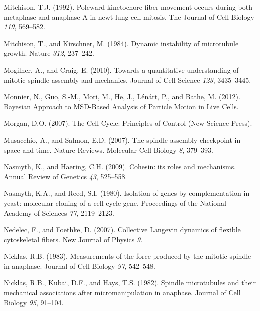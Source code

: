 \documentclass[12pt,a4paper,twoside,openright]{book}
\begin{document}
Mitchison, T.J. (1992). Poleward kinetochore fiber movement occurs
during both metaphase and anaphase-A in newt lung cell mitosis. The
Journal of Cell Biology \emph{119}, 569--582.

Mitchison, T., and Kirschner, M. (1984). Dynamic instability of
microtubule growth. Nature \emph{312}, 237--242.

Mogilner, A., and Craig, E. (2010). Towards a quantitative understanding
of mitotic spindle assembly and mechanics. Journal of Cell Science
\emph{123}, 3435--3445.

Monnier, N., Guo, S.-M., Mori, M., He, J., Lénárt, P., and Bathe, M.
(2012). Bayesian Approach to MSD-Based Analysis of Particle Motion in
Live Cells.

Morgan, D.O. (2007). The Cell Cycle: Principles of Control (New Science
Press).

Musacchio, A., and Salmon, E.D. (2007). The spindle-assembly checkpoint
in space and time. Nature Reviews. Molecular Cell Biology \emph{8},
379--393.

Nasmyth, K., and Haering, C.H. (2009). Cohesin: its roles and
mechanisms. Annual Review of Genetics \emph{43}, 525--558.

Nasmyth, K.A., and Reed, S.I. (1980). Isolation of genes by
complementation in yeast: molecular cloning of a cell-cycle gene.
Proceedings of the National Academy of Sciences \emph{77}, 2119--2123.

Nedelec, F., and Foethke, D. (2007). Collective Langevin dynamics of
flexible cytoskeletal fibers. New Journal of Physics \emph{9}.

Nicklas, R.B. (1983). Measurements of the force produced by the mitotic
spindle in anaphase. Journal of Cell Biology \emph{97}, 542--548.

Nicklas, R.B., Kubai, D.F., and Hays, T.S. (1982). Spindle microtubules
and their mechanical associations after micromanipulation in anaphase.
Journal of Cell Biology \emph{95}, 91--104.
\end{document}
